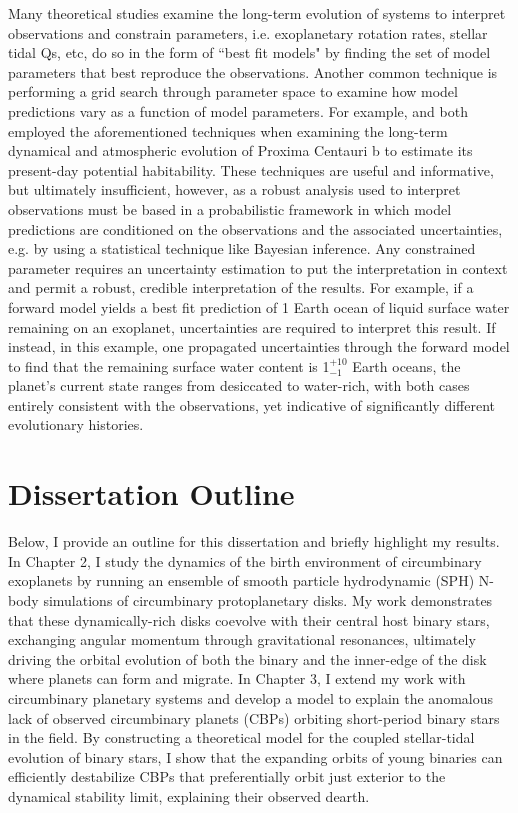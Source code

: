 Many theoretical studies examine the long-term evolution of systems to interpret observations and constrain parameters, i.e. exoplanetary rotation rates, stellar tidal Qs, etc, do so in the form of ``best fit models" by finding the set of model parameters that best reproduce the observations.  Another common technique is performing a grid search through parameter space to examine how model predictions vary as a function of model parameters.  For example, \citet{Ribas2016} and \citet{Barnes2016} both employed the aforementioned techniques when examining the long-term dynamical and atmospheric evolution of Proxima Centauri b to estimate its present-day potential habitability.  These techniques are useful and informative, but ultimately insufficient, however, as a robust analysis used to interpret observations must be based in a probabilistic framework in which model predictions are conditioned on the observations and the associated uncertainties, e.g. by using a statistical technique like Bayesian inference.  Any constrained parameter requires an uncertainty estimation to put the interpretation in context and permit a robust, credible interpretation of the results.  For example, if a forward model yields a best fit prediction of 1 Earth ocean of liquid surface water remaining on an exoplanet, uncertainties are required to interpret this result.  If instead, in this example, one propagated uncertainties through the forward model to find that the remaining surface water content is 1$^{+10}_{-1}$ Earth oceans, the planet's current state ranges from desiccated to water-rich, with both cases entirely consistent with the observations, yet indicative of significantly different evolutionary histories.  

\section{Dissertation Outline}

Below, I provide an outline for this dissertation and briefly highlight my results. In Chapter 2, I study the dynamics of the birth environment of circumbinary exoplanets by running an ensemble of smooth particle hydrodynamic (SPH) N-body simulations of circumbinary protoplanetary disks. My work demonstrates that these dynamically-rich disks coevolve with their central host binary stars, exchanging angular momentum through gravitational resonances, ultimately driving the orbital evolution of both the binary and the inner-edge of the disk where planets can form and migrate. In Chapter 3, I extend my work with circumbinary planetary systems and develop a model to explain the anomalous lack of observed circumbinary planets (CBPs) orbiting short-period binary stars in the \kepler field. By constructing a theoretical model for the coupled stellar-tidal evolution of binary stars, I show that the expanding orbits of young binaries can efficiently destabilize CBPs that preferentially orbit just exterior to the dynamical stability limit, explaining their observed dearth.

